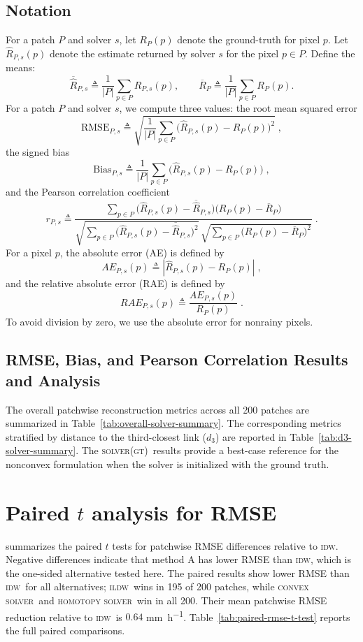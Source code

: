\documentclass[a4paper,fleqn]{cas-sc}
\DeclareRobustCommand{\IDW}{\textsc{idw}}
\DeclareRobustCommand{\ILDW}{\textsc{ildw}}
\DeclareRobustCommand{\solverGT}{\textsc{solver(gt)}}
\DeclareRobustCommand{\solverConvex}{\textsc{convex solver}}
\DeclareRobustCommand{\solverHomotopy}{\textsc{homotopy solver}}
\DeclareRobustCommand{\ConvexSolver}{\solverConvex}
\DeclareRobustCommand{\Homotopy}{\solverHomotopy}
\begin{document}
\subsection{Notation}
For a patch $P$ and solver $s$, let
$R_P(p)$ denote the ground-truth for pixel $p$.
Let $\widehat{R}_{P,s}(p)$ denote the estimate returned by solver $s$ for the pixel $p\in P$.
Define the means:
\[
  \overline{\widehat{R}}_{P,s}\triangleq \frac{1}{|P|}\sum_{p\in P}\widehat{R}_{P,s}(p),
  \qquad
  \overline{R}_P\triangleq \frac{1}{|P|}\sum_{p\in P}R_P(p).
\]
For a patch $P$ and solver $s$, we  compute three values: the root mean squared error
\[
  \mathrm{RMSE}_{P,s}\triangleq
  \sqrt{\frac{1}{|P|}\sum_{p\in P}\bigl(\widehat{R}_{P,s}(p)-R_P(p)\bigr)^2}\;,
\]
the signed bias
\[
  \mathrm{Bias}_{P,s}\triangleq
  \frac{1}{|P|}\sum_{p\in P}\bigl(\widehat{R}_{P,s}(p)-R_P(p)\bigr)\;,
\]
and the Pearson correlation coefficient
\[
  r_{P,s}\triangleq
  \frac{\sum_{p\in P}\bigl(\widehat{R}_{P,s}(p)-\overline{\widehat{R}}_{P,s}\bigr)\bigl(R_P(p)-\overline{R}_P\bigr)}
  {\sqrt{\sum_{p\in P}\bigl(\widehat{R}_{P,s}(p)-\overline{\widehat{R}}_{P,s}\bigr)^2}\,
    \sqrt{\sum_{p\in P}\bigl(R_P(p)-\overline{R}_P\bigr)^2}}\;.
\]
For a pixel $p$, the absolute error (AE) is defined by
\[
  AE_{P,s}(p) \triangleq |\widehat{R}_{P,s}(p)-R_P(p)|\;,
\]
and the relative absolute error (RAE) is defined by
\[
  RAE_{P,s}(p) \triangleq \frac{AE_{P,s}(p)}{R_P(p)}\;.
\]
To avoid division by zero, we use the absolute error for nonrainy pixels.
\subsection{RMSE, Bias, and Pearson Correlation Results and Analysis}


The overall patchwise reconstruction metrics across all 200 patches are summarized in Table~\ref{tab:overall-solver-summary}. The corresponding metrics stratified by distance to the third-closest link ($d_3$) are reported in Table~\ref{tab:d3-solver-summary}. The \solverGT\ results provide a best-case reference for the nonconvex formulation when the solver is initialized with the ground truth.




\section*{Paired $t$ analysis for RMSE}
 summarizes the paired $t$ tests for patchwise RMSE differences relative to \IDW. Negative differences indicate that method A has lower RMSE than \IDW, which is the one-sided alternative tested here. The paired results show lower RMSE than \IDW\ for all alternatives; \ILDW\ wins in 195 of 200 patches, while \ConvexSolver\ and \Homotopy\ win in all 200. Their mean patchwise RMSE reduction relative to \IDW\ is $0.64$ \si{\milli\meter\per\hour}. Table~\ref{tab:paired-rmse-t-test} reports the full paired comparisons.
\end{document}
